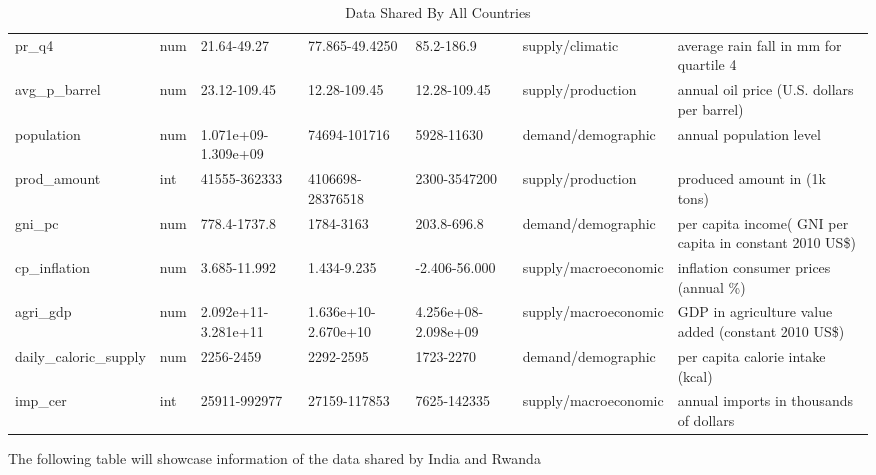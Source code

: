 \documentclass[11pt]{article}
\begin{document}
\begin{table}[!htbp]
\begin{adjustbox}{max width=\textwidth}
\begin{tabular}{lllllll}
pr\_q4                 & num      & 21.64-49.27         & 77.865-49.4250      & 85.2-186.9          & supply/climatic      & average rain fall in mm for quartile 4                   \\
avg\_p\_barrel         & num      & 23.12-109.45        & 12.28-109.45        & 12.28-109.45        & supply/production    & annual oil price (U.S. dollars per barrel)               \\
population             & num      & 1.071e+09-1.309e+09 & 74694-101716        & 5928-11630          & demand/demographic   & annual population level                                  \\
prod\_amount           & int      & 41555-362333        & 4106698-28376518    & 2300-3547200        & supply/production    & produced amount in (1k tons)                             \\
gni\_pc                & num      & 778.4-1737.8        & 1784-3163           & 203.8-696.8         & demand/demographic   & per capita income( GNI per capita in constant 2010 US\$) \\
cp\_inflation          & num      & 3.685-11.992        & 1.434-9.235         & -2.406-56.000       & supply/macroeconomic & inflation consumer prices (annual \%)                    \\
agri\_gdp              & num      & 2.092e+11-3.281e+11 & 1.636e+10-2.670e+10 & 4.256e+08-2.098e+09 & supply/macroeconomic & GDP in agriculture value added (constant 2010 US\$)      \\
daily\_caloric\_supply & num      & 2256-2459           & 2292-2595           & 1723-2270           & demand/demographic   & per capita calorie intake (kcal)                         \\
imp\_cer               & int      & 25911-992977        & 27159-117853        & 7625-142335         & supply/macroeconomic & annual imports in thousands of dollars                   \\  \hline

\end{tabular}

\end{adjustbox}
\caption{Data Shared By All Countries}
\label{table1}
\end{table}
\FloatBarrier
\newpage
The following table will showcase information of the data shared by India and Rwanda
\FloatBarrier
\end{document}
